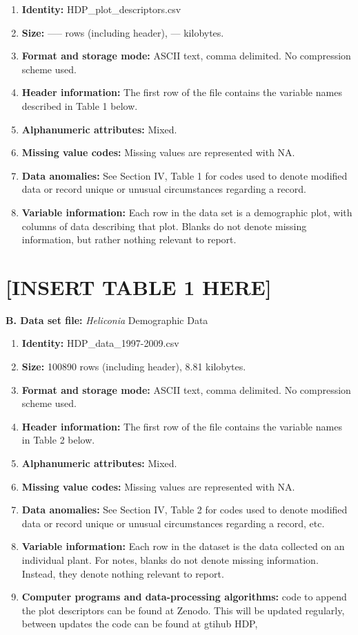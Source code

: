 \documentclass[
  english,
  man]{apa6}
\begin{document}
\begin{enumerate}
\def\labelenumi{\arabic{enumi}.}
\item
  \textbf{Identity:} HDP\_plot\_descriptors.csv
\item
  \textbf{Size:} ----- rows (including header), --- kilobytes.
\item
  \textbf{Format and storage mode:} ASCII text, comma delimited. No
  compression scheme used.
\item
  \textbf{Header information:} The first row of the file contains the
  variable names described in Table 1 below.
\item
  \textbf{Alphanumeric attributes:} Mixed.
\item
  \textbf{Missing value codes:} Missing values are represented with NA.
\item
  \textbf{Data anomalies:} See Section IV, Table 1 for codes used to denote
  modified data or record unique or unusual circumstances regarding a
  record.
\item
  \textbf{Variable information:} Each row in the data set is a demographic
  plot, with columns of data describing that plot. Blanks do not
  denote missing information, but rather nothing relevant to report.
\end{enumerate}

\hypertarget{insert-table-1-here}{%
\section{{[}INSERT TABLE 1 HERE{]}}\label{insert-table-1-here}}

\noindent 
\textbf{B. Data set file:} \emph{Heliconia} Demographic Data

\begin{enumerate}
\def\labelenumi{\arabic{enumi}.}
\item
  \textbf{Identity:} HDP\_data\_1997-2009.csv
\item
  \textbf{Size:} 100890 rows (including header), 8.81
  kilobytes.
\item
  \textbf{Format and storage mode:} ASCII text, comma delimited. No
  compression scheme used.
\item
  \textbf{Header information:} The first row of the file contains the
  variable names in Table 2 below.
\item
  \textbf{Alphanumeric attributes:} Mixed.
\item
  \textbf{Missing value codes:} Missing values are represented with NA.
\item
  \textbf{Data anomalies:} See Section IV, Table 2 for codes used to denote
  modified data or record unique or unusual circumstances regarding a
  record, etc.
\item
  \textbf{Variable information:} Each row in the dataset is the data
  collected on an individual plant. For notes, blanks do not denote
  missing information. Instead, they denote nothing relevant to
  report.
\item
  \textbf{Computer programs and data-processing algorithms:} code to append
  the plot descriptors can be found at Zenodo. This will be updated
  regularly, between updates the code can be found at gtihub HDP,
\end{enumerate}
\end{document}

